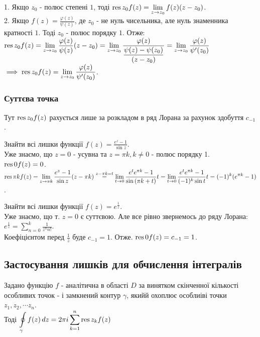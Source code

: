 \documentclass{math_library}
\begin{document}
\begin{corollary}
1. Якщо $z_0$ - полюс степені $1$, тоді $\displaystyle \operatorname*{res}{z_0}{f(z)} = \lim_{z \to z_0} f(z)(z-z_0)$.
\bigskip \\
2. Якщо $\displaystyle f(z) = \frac{\varphi (z)}{\psi (z)}$, де $z_0$ - не нуль чисельника, але нуль знаменника кратності $1$. Тоді $z_0$ - полюс порядку $1$. Отже:\\
$\displaystyle \operatorname*{res}{z_0}{f(z)} = \lim_{z \to z_0} \frac{\varphi (z)}{\psi (z)} (z-z_0) = \lim_{z \to z_0} \frac{\varphi (z)}{\displaystyle\frac{\psi (z)-\psi (z_0)}{(z-z_0)}} = \lim_{z \to z_0} \frac{\varphi(z)}{\psi'(z_0)}$\\
$\implies \displaystyle \operatorname*{res}{z_0}{f(z)} = \lim_{z \to z_0} \frac{\varphi(z)}{\psi'(z_0)}$.
\end{corollary}

\subsubsection{Суттєва точка}
Тут $\operatorname*{res}{z_0}{f(z)}$ рахується лише за розкладом в ряд Лорана за рахунок здобуття $c_{-1}$.

\begin{example}
Знайти всі лишки функції $\displaystyle f(z) = \frac{e^z-1}{\sin z}$.\\
Уже знаємо, що $z = 0$ - усувна та $z = \pi k, k \neq 0$ - полюс порядку 1.\\
$\operatorname*{res}{0}{f(z)} = 0$.\\
$\displaystyle \operatorname*{res}{\pi k}{f(z)} = \lim_{z \to \pi k} \frac{e^z-1}{\sin z} (z - \pi k) \overset{z - \pi k = t}{=} \lim_{t \to 0} \frac{e^{t}e^{\pi k} - 1}{\sin{(\pi k + t)}} t = \lim_{t \to 0} \frac{e^{t}e^{\pi k} - 1}{(-1)^k\sin{t}} t = (-1)^k (e^{\pi k} - 1)$.
\end{example}

\begin{example}
Знайти всі лишки функції $\displaystyle f(z) = e^{\textstyle \frac{1}{z}}$.\\
Уже знаємо, що т. $z = 0$ є суттєвою. Але все рівно звернемось до ряду Лорана:\\
$\displaystyle e^{\textstyle \frac{1}{z}} = \sum_{n=0}^k \frac{1}{z^n n!}$.\\
Коефіцієнтом перед $\displaystyle \frac{1}{z}$ буде $c_{-1} = 1$. Отже. $\operatorname*{res}{0}{f(z)} = c_{-1} = 1$.
\end{example}

\subsection{Застосування лишків для обчислення інтегралів}
\begin{theorem}
Задано функцію $f$ - аналітична в області $D$ за винятком скінченної кількості особливих точок - і замкнений контур $\gamma$, якийй охоплює особлиіві точки $z_1,z_2,\cdots z_n$. \\
Тоді $\displaystyle\oint\displaylimits_{\gamma} f(z)\,dz = 2 \pi i \sum_{k=1}^{n} \operatorname*{res}{z_k}{f(z)}$
\end{theorem}
\end{document}
